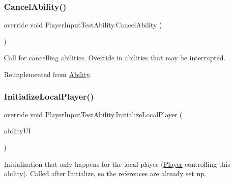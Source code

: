 \hypertarget{class_player_input_test_ability_adc59dfeabbb2e1cdff7b81797c9f3946}{}\label{class_player_input_test_ability_adc59dfeabbb2e1cdff7b81797c9f3946} 
\subsubsection{\texorpdfstring{Cancel\+Ability()}{CancelAbility()}}
{\footnotesize\ttfamily override void Player\+Input\+Test\+Ability.\+Cancel\+Ability (\begin{DoxyParamCaption}{ }\end{DoxyParamCaption})\hspace{0.3cm}{\ttfamily [virtual]}}



Call for cancelling abilities. Override in abilities that may be interrupted. 



Reimplemented from \hyperlink{class_ability_ab0eaf1ad670e0624a5534c50b10c002f}{Ability}.

\hypertarget{class_player_input_test_ability_a8ac71832a1fd267f30881d969767ca16}{}\label{class_player_input_test_ability_a8ac71832a1fd267f30881d969767ca16} 
\subsubsection{\texorpdfstring{Initialize\+Local\+Player()}{InitializeLocalPlayer()}}
{\footnotesize\ttfamily override void Player\+Input\+Test\+Ability.\+Initialize\+Local\+Player (\begin{DoxyParamCaption}\item[{\hyperlink{class_ability_u_i}{Ability\+UI}}]{ability\+UI }\end{DoxyParamCaption})\hspace{0.3cm}{\ttfamily [virtual]}}



Initialization that only happens for the local player (\hyperlink{class_player}{Player} controlling this ability). Called after Initialize, so the references are already set up. 



